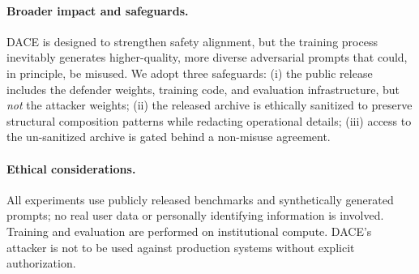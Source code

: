 \documentclass{article}
\newcommand{\method}{\textsc{DACE}\xspace}
\begin{document}
\paragraph{Broader impact and safeguards.}
\method is designed to strengthen safety alignment, but the training process inevitably generates higher-quality, more diverse adversarial prompts that could, in principle, be misused. We adopt three safeguards: (i) the public release includes the defender weights, training code, and evaluation infrastructure, but \emph{not} the attacker weights; (ii) the released archive is ethically sanitized to preserve structural composition patterns while redacting operational details; (iii) access to the un-sanitized archive is gated behind a non-misuse agreement.

\paragraph{Ethical considerations.}
All experiments use publicly released benchmarks and synthetically generated prompts; no real user data or personally identifying information is involved. Training and evaluation are performed on institutional compute. \method's attacker is not to be used against production systems without explicit authorization.




\end{document}
